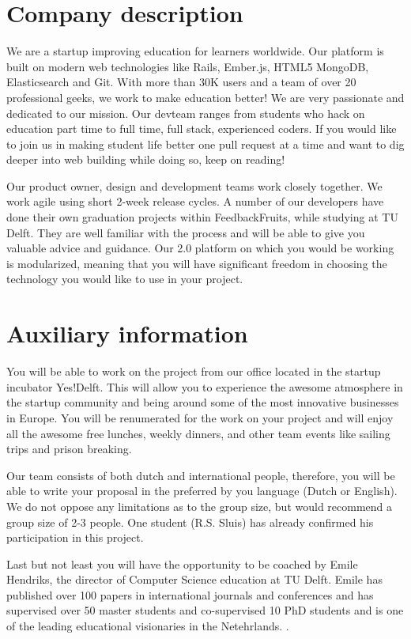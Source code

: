 \section{Company description}

We are a startup improving education for learners worldwide. Our platform is built on modern web technologies like Rails, Ember.js, HTML5 MongoDB, Elasticsearch and Git. With more than 30K users and a team of over 20 professional geeks, we work to make education better! We are very passionate and dedicated to our mission. Our devteam ranges from students who hack on education part time to full time, full stack, experienced coders. If you would like to join us in making student life better one pull request at a time and want to dig deeper into web building while doing so, keep on reading!

Our product owner, design and development teams work closely together. We work agile using short 2-week release cycles. A number of our developers have done their own graduation projects within FeedbackFruits, while studying at TU Delft. They are well familiar with the process and will be able to give you valuable advice and guidance. Our 2.0 platform on which you would be working is modularized, meaning that you will have significant freedom in choosing the technology you would like to use in your project. 

\section{Auxiliary information}

You will be able to work on the project from our office located in the startup incubator Yes!Delft. This will allow you to experience the awesome atmosphere in the startup community and being around some of the most innovative businesses in Europe. You will be renumerated for the work on your project and will enjoy all the awesome free lunches, weekly dinners, and other team events like sailing trips and prison breaking.

Our team consists of both dutch and international people, therefore, you will be able to write your proposal in the preferred by you language (Dutch or English). We do not oppose any limitations as to the group size, but would recommend a group size of 2-3 people. One student (R.S. Sluis) has already confirmed his participation in this project.

Last but not least you will have the opportunity to be coached by Emile Hendriks, the director of Computer Science education at TU Delft. Emile has published over 100 papers in international journals and conferences and has supervised over 50 master students and co-supervised 10 PhD students and is one of the leading educational visionaries in the Netehrlands. .